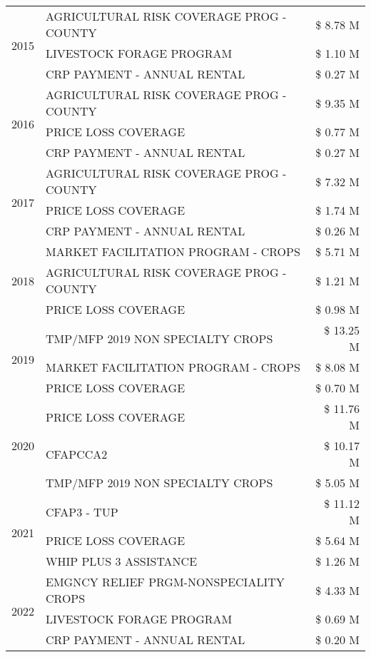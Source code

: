 \begin{tabular}{llr}
\multirow[t]{3}{*}{2015} & AGRICULTURAL RISK COVERAGE PROG - COUNTY & \$ 8.78 M \\
 & LIVESTOCK FORAGE PROGRAM & \$ 1.10 M \\
 & CRP PAYMENT - ANNUAL RENTAL & \$ 0.27 M \\
\cline{1-3}
\multirow[t]{3}{*}{2016} & AGRICULTURAL RISK COVERAGE PROG - COUNTY & \$ 9.35 M \\
 & PRICE LOSS COVERAGE & \$ 0.77 M \\
 & CRP PAYMENT - ANNUAL RENTAL & \$ 0.27 M \\
\cline{1-3}
\multirow[t]{3}{*}{2017} & AGRICULTURAL RISK COVERAGE PROG - COUNTY & \$ 7.32 M \\
 & PRICE LOSS COVERAGE & \$ 1.74 M \\
 & CRP PAYMENT - ANNUAL RENTAL & \$ 0.26 M \\
\cline{1-3}
\multirow[t]{3}{*}{2018} & MARKET FACILITATION PROGRAM - CROPS & \$ 5.71 M \\
 & AGRICULTURAL RISK COVERAGE PROG - COUNTY & \$ 1.21 M \\
 & PRICE LOSS COVERAGE & \$ 0.98 M \\
\cline{1-3}
\multirow[t]{3}{*}{2019} & TMP/MFP 2019 NON SPECIALTY CROPS & \$ 13.25 M \\
 & MARKET FACILITATION PROGRAM - CROPS & \$ 8.08 M \\
 & PRICE LOSS COVERAGE & \$ 0.70 M \\
\cline{1-3}
\multirow[t]{3}{*}{2020} & PRICE LOSS COVERAGE & \$ 11.76 M \\
 & CFAPCCA2 & \$ 10.17 M \\
 & TMP/MFP 2019 NON SPECIALTY CROPS & \$ 5.05 M \\
\cline{1-3}
\multirow[t]{3}{*}{2021} & CFAP3 - TUP & \$ 11.12 M \\
 & PRICE LOSS COVERAGE & \$ 5.64 M \\
 & WHIP PLUS 3 ASSISTANCE & \$ 1.26 M \\
\cline{1-3}
\multirow[t]{3}{*}{2022} & EMGNCY RELIEF PRGM-NONSPECIALITY CROPS & \$ 4.33 M \\
 & LIVESTOCK FORAGE PROGRAM & \$ 0.69 M \\
 & CRP PAYMENT - ANNUAL RENTAL & \$ 0.20 M \\
\cline{1-3}
\bottomrule
\end{tabular}
